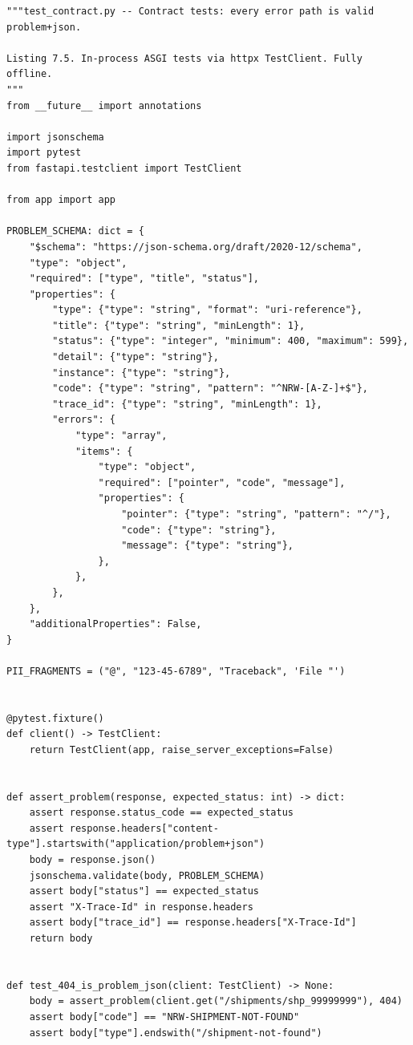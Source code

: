 \begin{verbatim}
"""test_contract.py -- Contract tests: every error path is valid problem+json.

Listing 7.5. In-process ASGI tests via httpx TestClient. Fully offline.
"""
from __future__ import annotations

import jsonschema
import pytest
from fastapi.testclient import TestClient

from app import app

PROBLEM_SCHEMA: dict = {
    "$schema": "https://json-schema.org/draft/2020-12/schema",
    "type": "object",
    "required": ["type", "title", "status"],
    "properties": {
        "type": {"type": "string", "format": "uri-reference"},
        "title": {"type": "string", "minLength": 1},
        "status": {"type": "integer", "minimum": 400, "maximum": 599},
        "detail": {"type": "string"},
        "instance": {"type": "string"},
        "code": {"type": "string", "pattern": "^NRW-[A-Z-]+$"},
        "trace_id": {"type": "string", "minLength": 1},
        "errors": {
            "type": "array",
            "items": {
                "type": "object",
                "required": ["pointer", "code", "message"],
                "properties": {
                    "pointer": {"type": "string", "pattern": "^/"},
                    "code": {"type": "string"},
                    "message": {"type": "string"},
                },
            },
        },
    },
    "additionalProperties": False,
}

PII_FRAGMENTS = ("@", "123-45-6789", "Traceback", 'File "')


@pytest.fixture()
def client() -> TestClient:
    return TestClient(app, raise_server_exceptions=False)


def assert_problem(response, expected_status: int) -> dict:
    assert response.status_code == expected_status
    assert response.headers["content-type"].startswith("application/problem+json")
    body = response.json()
    jsonschema.validate(body, PROBLEM_SCHEMA)
    assert body["status"] == expected_status
    assert "X-Trace-Id" in response.headers
    assert body["trace_id"] == response.headers["X-Trace-Id"]
    return body


def test_404_is_problem_json(client: TestClient) -> None:
    body = assert_problem(client.get("/shipments/shp_99999999"), 404)
    assert body["code"] == "NRW-SHIPMENT-NOT-FOUND"
    assert body["type"].endswith("/shipment-not-found")



\end{verbatim}
